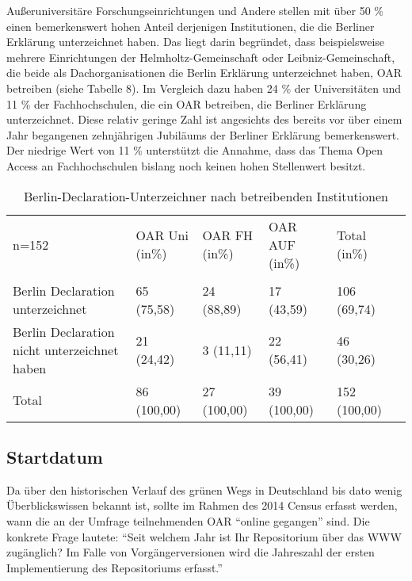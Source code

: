 \documentclass[a4paper,
fontsize=11pt,
oneside,
numbers=noperiodatend,
parskip=half-,
bibliography=totoc,
final
]{scrartcl}
\begin{document}
Außeruniversitäre Forschungseinrichtungen und Andere stellen mit über 50
\% einen bemerkenswert hohen Anteil derjenigen Institutionen, die die
Berliner Erklärung unterzeichnet haben. Das liegt darin begründet, dass
beispielsweise mehrere Einrichtungen der Helm\-holtz-Ge\-mein\-schaft oder
Leibniz-Gemeinschaft, die beide als Dachorganisationen die Berlin
Erklärung unterzeichnet haben, OAR betreiben (siehe Tabelle 8). Im
Vergleich dazu haben 24 \% der Universitäten und 11 \% der
Fachhochschulen, die ein OAR betreiben, die Berliner Erklärung
unterzeichnet. Diese relativ geringe Zahl ist angesichts des bereits vor
über einem Jahr begangenen zehnjährigen Jubiläums der Berliner Erklärung
bemerkenswert. Der niedrige Wert von 11 \% unterstützt die Annahme, dass
das Thema Open Access an Fachhochschulen bislang noch keinen hohen
Stellenwert besitzt.

\begin{table}[ht]
\centering
\begin{tabular}{p{3cm} lllll}
  \toprule
n=152 & OAR Uni (in\%)   & OAR FH (in\%)  & OAR AUF (in\%)  & Total (in\%) \\  
\cmidrule(r){1-1} \cmidrule(r){2-2} \cmidrule(r){3-3} \cmidrule(r){4-4} \cmidrule(r){5-5} \\ 
 Berlin Declaration unterzeichnet & 65 (75,58) & 24 (88,89) & 17 (43,59) & 106 (69,74) \\ 
Berlin Declaration nicht unterzeichnet haben & 21 (24,42) & 3 (11,11) & 22 (56,41) & 46 (30,26)  \\ 
\cmidrule(r){1-1} \cmidrule(r){2-2} \cmidrule(r){3-3} \cmidrule(r){4-4} \cmidrule(r){5-5}  
Total & 86 (100,00) & 27 (100,00) & 39 (100,00) & 152 (100,00) \\
\bottomrule
  \end{tabular}
  \caption{Berlin-Declaration-Unterzeichner nach betreibenden
Institutionen}
\end{table}

\subsection*{Startdatum}\label{Startdatum}

Da über den historischen Verlauf des grünen Wegs in Deutschland bis dato
wenig Überblickswissen bekannt ist, sollte im Rahmen des 2014 Census
erfasst werden, wann die an der Umfrage teilnehmenden OAR
\enquote{online gegangen} sind. Die konkrete Frage lautete:
\enquote{Seit welchem Jahr ist Ihr Repositorium über das WWW zugänglich?
Im Falle von Vorgängerversionen wird die Jahreszahl der ersten
Implementierung des Repositoriums erfasst.}
\end{document}
